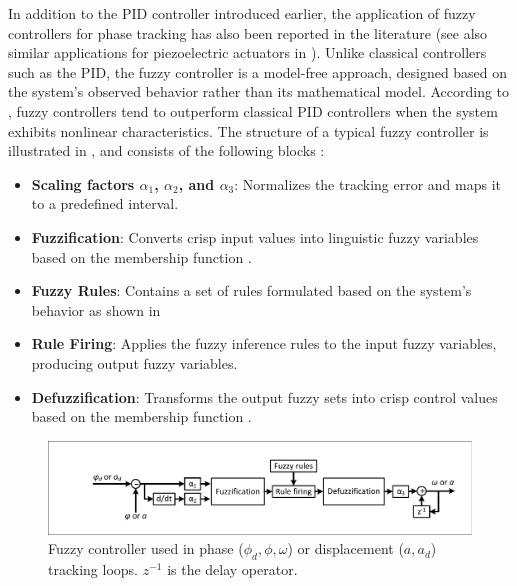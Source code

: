 \documentclass[lettersize,journal]{IEEEtran}
\begin{document}
In addition to the PID controller introduced earlier, the application of fuzzy controllers for phase tracking has also been reported in the literature \cite{Ji_2010} (see also similar applications for piezoelectric actuators in \cite{MA2024107318,ZHANG2015140}). Unlike classical controllers such as the PID, the fuzzy controller is a model-free approach, designed based on the system's observed behavior rather than its mathematical model. According to \cite{Ross2005fuzzy}, fuzzy controllers tend to outperform classical PID controllers when the system exhibits nonlinear characteristics. The structure of a typical fuzzy controller is illustrated in , and consists of the following blocks \cite{Ross2005fuzzy}:
\begin{itemize}
    \item \textbf{Scaling factors $\alpha_1$, $\alpha_2$, and $\alpha_3$}: Normalizes the tracking error and maps it to a predefined interval.
    \item \textbf{Fuzzification}: Converts crisp input values into linguistic fuzzy variables based on the membership function .
    \item \textbf{Fuzzy Rules}: Contains a set of rules formulated based on the system's behavior as shown in 
    \item \textbf{Rule Firing}: Applies the fuzzy inference rules to the input fuzzy variables, producing output fuzzy variables.
    \item \textbf{Defuzzification}: Transforms the output fuzzy sets into crisp control values based on the membership function .
\end{itemize}
\begin{figure}
    \centering    \includegraphics[width=0.9\linewidth]{Fuzzy_controller.pdf}
    \caption{Fuzzy controller used in phase ($\phi_d, \phi, \omega$) or displacement ($a, a_d$) tracking loops. $z^{-1}$ is the delay operator.}
    \label{F_fuzzy_diagram}
\end{figure}
\end{document}

